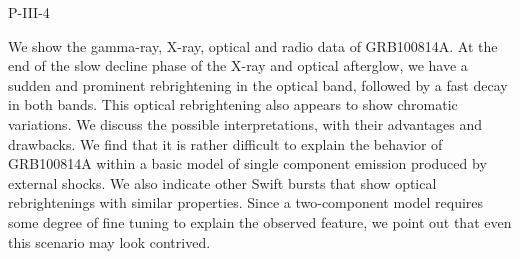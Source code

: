 P-III-4


\bigskip



\bigskip

\noindent We show the gamma-ray, X-ray, optical and radio data of GRB100814A. At the end of the slow decline phase of the X-ray and optical afterglow, we have a sudden and prominent rebrightening in the optical band, followed by a fast decay in both bands. This optical rebrightening also appears to show chromatic variations.
We discuss the possible interpretations, with their advantages and drawbacks. We find that it is rather difficult to explain the behavior of GRB100814A within a basic model of single component emission produced by external shocks.
We also indicate other Swift bursts that show optical rebrightenings with similar properties. Since a two-component model requires some degree of fine tuning to explain the observed feature, we point out that even this scenario may look contrived.

